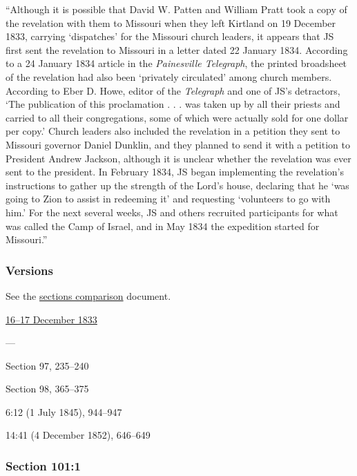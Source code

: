 			``Although it is possible that David W. Patten and William Pratt took a copy of the revelation with them to Missouri when they left Kirtland on 19 December 1833, carrying `dispatches' for the Missouri church leaders, it appears that JS first sent the revelation to Missouri in a letter dated 22 January 1834. According to a 24 January 1834 article in the \textit{Painesville Telegraph}, the printed broadsheet of the revelation had also been `privately circulated' among church members. According to Eber D. Howe, editor of the \textit{Telegraph} and one of JS's detractors, `The publication of this proclamation . . . was taken up by all their priests and carried to all their congregations, some of which were actually sold for one dollar per copy.' Church leaders also included the revelation in a petition they sent to Missouri governor Daniel Dunklin, and they planned to send it with a petition to President Andrew Jackson, although it is unclear whether the revelation was ever sent to the president. In February 1834, JS began implementing the revelation's instructions to gather up the strength of the Lord's house, declaring that he `was going to Zion to assist in redeeming it' and requesting `volunteers to go with him.' For the next several weeks, JS and others recruited participants for what was called the Camp of Israel, and in May 1834 the expedition started for Missouri.''
				
	\subsubsection{Versions}
		\label{DC101-V}
		
		See the \href{https://drive.google.com/file/d/1goAvNz8jS4R8slYfMG_db55Ty2z_vmgK/view?usp=sharing}{sections comparison} document.
	
		\begin{compactdesc}
			\item[JSP] \hyperref[EMS-1833-JS-16-17-DEC-1833]{16--17 December 1833}
			\item[BC] ---
			\item[DC 1835] Section 97, 235--240
			\item[DC 1844] Section 98, 365--375
			\item[TS] 6:12 (1 July 1845), 944--947
			\item[MS] 14:41 (4 December 1852), 646--649
		\end{compactdesc}

	\subsubsection{Section 101:1} %
		\label{DC101-1}

